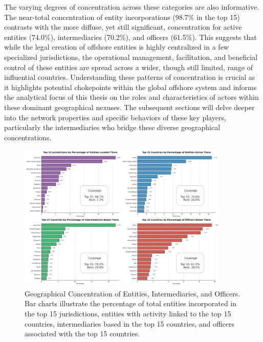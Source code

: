 The varying degrees of concentration across these categories are also informative. The near-total concentration of entity incorporations (98.7\% in the top 15) contrasts with the more diffuse, yet still significant, concentration for active entities (74.0\%), intermediaries (70.2\%), and officers (61.5\%). This suggests that while the legal creation of offshore entities is highly centralized in a few specialized jurisdictions, the operational management, facilitation, and beneficial control of these entities are spread across a wider, though still limited, range of influential countries. Understanding these patterns of concentration is crucial as it highlights potential chokepoints within the global offshore system and informs the analytical focus of this thesis on the roles and characteristics of actors within these dominant geographical nexuses. The subsequent sections will delve deeper into the network properties and specific behaviors of these key players, particularly the intermediaries who bridge these diverse geographical concentrations.

\begin{figure}[htbp]
    \centering
    \includegraphics[width=0.9\textwidth]{images/Preliminary_Geography_Overview.png} %
    \caption{Geographical Concentration of Entities, Intermediaries, and Officers. Bar charts illustrate the percentage of total entities incorporated in the top 15 jurisdictions, entities with activity linked to the top 15 countries, intermediaries based in the top 15 countries, and officers associated with the top 15 countries.}
    \label{fig:preliminary_geography_overview}
\end{figure}

